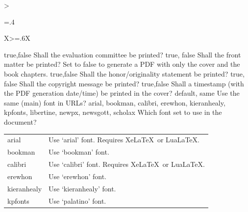 \begin{xltabular}{\linewidth}{>{\hsize=.4\hsize\raggedright\arraybackslash}X>{\hsize=.6\hsize}X}
	    \midrule
  	  	{true,\newline false}%
	    {Shall the evaluation committee be printed?}%
		{%
	    }
	    \midrule
  	  	{true, \newline false}%
	    {Shall the front matter be printed?}%
		{Set to false to generate a PDF with only the cover and the book chapters.}
	    \midrule
  	  	{true,\newline false }%
	    {Shall the honor/originality statement be printed?}%
		{}
	    \midrule
  	  	{true, \newline false}%
	    {Shall the copyright message be printed?}%
		{}
	    \midrule
  	  	{true,\newline false}%
	    {Shall a timestamp (with the PDF generation date/time) be printed in the cover?}%
		{%
		}
	    \midrule
  	  	{default, \newline same}%
	    {Use the same (main) font in URLs?}%
		{}
    \midrule
    {arial, bookman, calibri, erewhon, kieranhealy, kpfonts, libertine, newpx, newsgott, scholax}%
    {Which font set to use in the document?}%
	{%
    \begin{tabular}{@{}l@{ $\rightarrow$ }X@{}}
		arial 		& Use `arial' font. Requires Xe\LaTeX\ or Lua\LaTeX.\\
		bookman 	& Use `bookman' font.\\
		calibri 	& Use `calibri' font. Requires Xe\LaTeX\ or Lua\LaTeX.\\
		erewhon 	& Use `erewhon' font.\\
		kieranhealy & Use `kieranhealy' font.\\
		kpfonts 	& Use `palatino' font.\\

\end{tabular}}
\end{xltabular}
